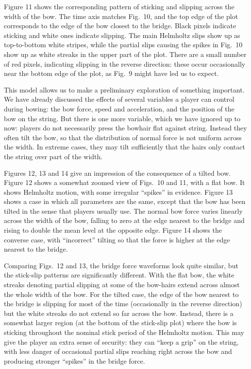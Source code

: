   Figure 11 shows the corresponding pattern of sticking and slipping across the 
  width of the bow. The time axis matches Fig.\ 10, and the top edge of the 
  plot corresponds to the edge of the bow closest to the bridge. Black pixels 
  indicate sticking and white ones indicate slipping. The main Helmholtz slips 
  show up as top-to-bottom white stripes, while the partial slips causing the 
  spikes in Fig.\ 10 show up as white streaks in the upper part of the plot. 
  There are a small number of red pixels, indicating slipping in the reverse 
  direction: these occur occasionally near the bottom edge of the plot, as 
  Fig.\ 9 might have led us to expect. 

  This model allows us to make a preliminary exploration of something 
  important. We have already discussed the effects of several variables a 
  player can control during bowing: the bow force, speed and acceleration, and 
  the position of the bow on the string. But there is one more variable, which 
  we have ignored up to now: players do not necessarily press the bowhair flat 
  against string. Instead they often tilt the bow, so that the distribution of 
  normal force is not uniform across the width. In extreme cases, they may tilt 
  sufficiently that the hairs only contact the string over part of the width. 

  Figures 12, 13 and 14 give an impression of the consequence of a tilted bow. 
  Figure 12 shows a somewhat zoomed view of Figs.\ 10 and 11, with a flat bow. 
  It shows Helmholtz motion, with some irregular “spikes” in evidence. Figure 
  13 shows a case in which all parameters are the same, except that the bow has 
  been tilted in the sense that players usually use. The normal bow force 
  varies linearly across the width of the bow, falling to zero at the edge 
  nearest to the bridge and rising to double the mean level at the opposite 
  edge. Figure 14 shows the converse case, with “incorrect” tilting so that the 
  force is higher at the edge nearest to the bridge. 

  Comparing Figs.\ 12 and 13, the bridge force waveforms look quite similar, 
  but the stick-slip patterns are significantly different. With the flat bow, 
  the white streaks denoting partial slipping at some of the bow-hairs extend 
  across almost the whole width of the bow. For the tilted case, the edge of 
  the bow nearest to the bridge is slipping for most of the time (occasionally 
  in the reverse direction) but the white streaks do not extend so far across 
  the bow. Instead, there is a somewhat larger region (at the bottom of the 
  stick-slip plot) where the bow is sticking throughout the nominal stick 
  period of the Helmholtz motion. This may give the player an extra sense of 
  security: they can “keep a grip” on the string, with less danger of 
  occasional partial slips reaching right across the bow and producing stronger 
  “spikes” in the bridge force. 

